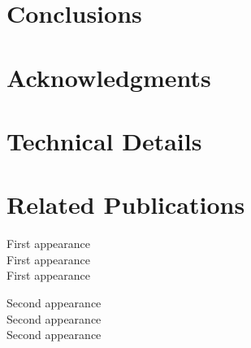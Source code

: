 \documentclass[article]{jss}
\begin{document}
\section{Conclusions} \label{section:conslcusions}

\section{Acknowledgments} \label{section:acknowledgments}







\newpage

\begin{appendix}

\section*{Technical Details} \label{appendix:technical-details}


\section*{Related Publications} \label{appendix:technical-details}
First appearance \cite{fast-online-changepoint-detection-via-functional-pruning-cusum-statistics} \\
First appearance \cite{a-constant-per-iteration-likelihood-ratio-test-for-online-changepoint-detection-for-exponential-family-models} \\
First appearance \cite{a-log-linear-nonparametric-online-changepoint-detection-algorithm-based-on-functional-pruning}

Second appearance \citep{fast-online-changepoint-detection-via-functional-pruning-cusum-statistics} \\
Second appearance \citep{a-constant-per-iteration-likelihood-ratio-test-for-online-changepoint-detection-for-exponential-family-models} \\
Second appearance \citep{a-log-linear-nonparametric-online-changepoint-detection-algorithm-based-on-functional-pruning}



\end{appendix}

\end{document}
